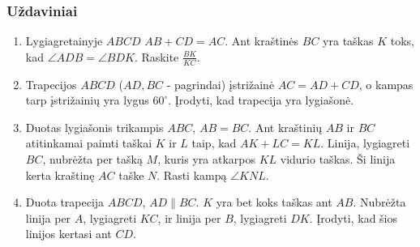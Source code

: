 \subsubsection{Uždaviniai}

\begin{enumerate}
\item Lygiagretainyje $ABCD$ $AB + CD = AC$. Ant kraštinės $BC$ yra taškas
  $K$ toks, kad $\angle ADB = \angle BDK$.  Raskite $\frac{BK}{KC}$.
\item Trapecijos $ABCD$ ($AD, BC$ - pagrindai) įstrižainė $AC = AD + CD$, o
  kampas tarp įstrižainių yra lygus $60^\circ$. Įrodyti, kad trapecija yra
  lygiašonė.
\item Duotas lygiašonis trikampis $ABC$, $AB = BC$. Ant kraštinių $AB$ ir
  $BC$ atitinkamai paimti taškai $K$ ir $L$ taip, kad $AK + LC = KL$.
  Linija, lygiagreti $BC$, nubrėžta per tašką $M$, kuris yra atkarpos $KL$
  vidurio taškas. Ši linija kerta kraštinę $AC$ taške $N$. Rasti kampą
  $\angle KNL$.
\item Duota trapecija $ABCD$, $AD\parallel{BC}$. $K$ yra bet koks taškas
  ant $AB$. Nubrėžta linija per $A$, lygiagreti $KC$, ir linija per $B$,
  lygiagreti $DK$. Įrodyti, kad šios linijos kertasi ant $CD$.

\end{enumerate}
